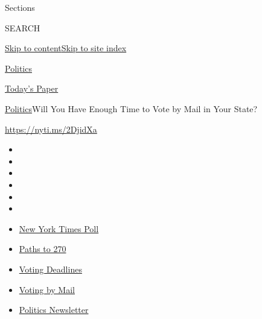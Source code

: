 Sections

SEARCH

\protect\hyperlink{site-content}{Skip to
content}\protect\hyperlink{site-index}{Skip to site index}

\href{https://www.nytimes3xbfgragh.onion/section/politics}{Politics}

\href{https://myaccount.nytimes3xbfgragh.onion/auth/login?response_type=cookie\&client_id=vi}{}

\href{https://www.nytimes3xbfgragh.onion/section/todayspaper}{Today's
Paper}

\href{/section/politics}{Politics}\textbar{}Will You Have Enough Time to
Vote by Mail in Your State?

\url{https://nyti.ms/2DjidXa}

\begin{itemize}
\item
\item
\item
\item
\item
\item
\end{itemize}

\begin{itemize}
\item
  \href{https://www.nytimes3xbfgragh.onion/2020/09/12/us/politics/biden-trump-poll-wisconsin-minnesota.html?action=click\&pgtype=Article\&state=default\&region=TOP_BANNER\&context=storylines_menu}{New
  York Times Poll}
\item
  \href{https://www.nytimes3xbfgragh.onion/interactive/2020/us/elections/election-states-biden-trump.html?action=click\&pgtype=Article\&state=default\&region=TOP_BANNER\&context=storylines_menu}{Paths
  to 270}
\item
  \href{https://www.nytimes3xbfgragh.onion/interactive/2019/us/elections/2020-presidential-election-calendar.html?action=click\&pgtype=Article\&state=default\&region=TOP_BANNER\&context=storylines_menu}{Voting
  Deadlines}
\item
  \href{https://www.nytimes3xbfgragh.onion/interactive/2020/08/31/us/politics/vote-by-mail-deadlines.html?action=click\&pgtype=Article\&state=default\&region=TOP_BANNER\&context=storylines_menu}{Voting
  by Mail}
\item
  \href{https://www.nytimes3xbfgragh.onion/newsletters/politics?action=click\&pgtype=Article\&state=default\&region=TOP_BANNER\&context=storylines_menu}{Politics
  Newsletter}
\end{itemize}

